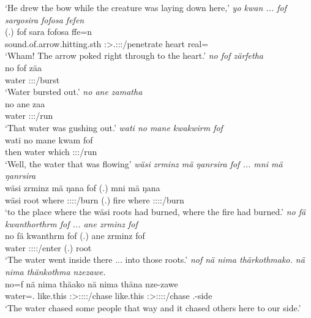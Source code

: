 \begin{exe}
	\trans `He drew the bow while the creature was laying down here,'
	\emph{yo kwan ... fof sargosira fofosa fefen}\\
	 (.) fof sara fofosa ffe=n\\ 
	sound.of.arrow.hitting.sth \Emph{} \Sg:\Sbj>\Tsg.\Masc:\Obj:\Pst:\Ipfv/penetrate heart real=\Loc{}\\
	\trans `Wham! The arrow poked right through to the heart.'
	\emph{no fof zärfetha}\\
	\gll no fof zäa\\ 
	water \Emph{} \Sg:\Sbj:\Pst:\Pfv/burst\\
	\trans `Water bursted out.'
	\emph{no ane zamatha}\\
	\gll no ane zaa\\ 
	water \Dem{} \Sg:\Sbj:\Pst:\Pfv/run\\
	\trans `That water was gushing out.'
	\emph{wati no mane kwakwirm fof}\\
	\gll wati no mane kwam fof\\ 
	then water which \Sg:\Sbj:\Pst:\Dur/run \Emph{}\\
	\trans `Well, the water that was flowing'
	\emph{wäsi zrminz mä ŋanrsira fof ... mni mä ŋanrsira}\\
	\gll wäsi zrminz mä ŋana fof (.) mni mä ŋana\\ 
	wäsi root where \Sg:\Sbj:\Pst:\Ipfv:\Venit/burn \Emph{} (.) fire where \Sg:\Sbj:\Pst:\Ipfv:\Venit/burn\\
	\trans `to the place where the wäsi roots had burned, where the fire had burned.'
	\emph{no fä kwanthorthrm fof ... ane zrminz fof}\\
	\gll no fä kwanthrm fof (.) ane zrminz fof\\ 
	water \Dist{} \Sg:\Sbj:\Pst:\Dur:\Venit/enter \Emph{} (.) \Dem{} root \Emph{}\\
	\trans `The water went inside there ... into those roots.'
	\emph{nof nä nima thärkothmako. nä nima thänkothma nzezawe.}\\
	\gll no=f nä nima thäako nä nima thäna nze-zawe\\ 
	water=\Erg.\Sg{} \Indf{} like.this \Sg:\Sbj>\Stpl:\Obj:\Pst:\Pfv:\Andat/chase \Indf{} like.this \Sg:\Sbj>\Stpl:\Obj:\Pst:\Pfv:\Venit/chase \Fnsg.\Poss-side\\
	\trans `The water chased some people that way and it chased others here to our side.'

\end{exe}
